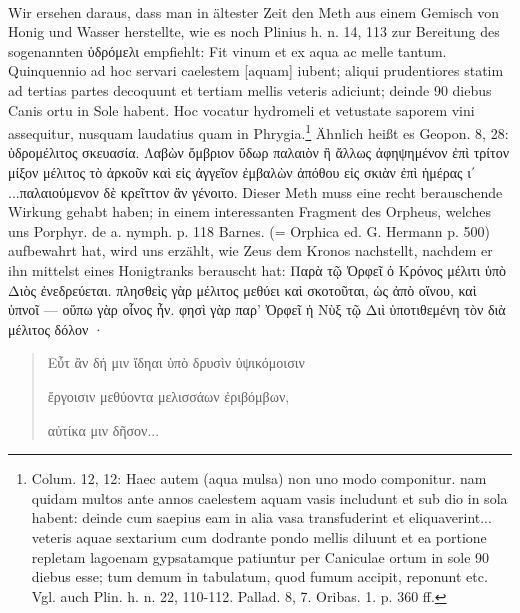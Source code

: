 \documentclass[a4paper, 11pt, oneside]{article}
\begin{document}
\paragraph{}
Wir ersehen daraus, dass man in ältester Zeit den Meth aus einem Gemisch von Honig und Wasser herstellte, wie es noch Plinius h. n. 14, 113 zur Bereitung des sogenannten ὑδρόμελι empfiehlt: Fit vinum et ex aqua ac melle tantum. Quinquennio ad hoc servari caelestem [aquam] iubent; aliqui prudentiores statim ad tertias partes decoquunt et tertiam mellis veteris adiciunt; deinde 90 diebus Canis ortu in Sole habent. Hoc vocatur hydromeli et vetustate saporem vini assequitur, nusquam laudatius quam in Phrygia.\footnote{Colum. 12, 12: Haec autem (aqua mulsa) non uno modo componitur. nam quidam multos ante annos caelestem aquam vasis includunt et sub dio in sola habent: deinde cum saepius eam in alia vasa transfuderint et eliquaverint... veteris aquae sextarium cum dodrante pondo mellis diluunt et ea portione repletam lagoenam gypsatamque patiuntur per Caniculae ortum in sole 90 diebus esse; tum demum in tabulatum, quod fumum accipit, reponunt etc. Vgl. auch Plin. h. n. 22, 110-112. Pallad. 8, 7. Oribas. 1. p. 360 ff.} Ähnlich heißt es Geopon. 8, 28: ὑδρομέλιτος σκευασία. Λαβὼν ὄμβριον ὕδωρ παλαιὸν ἢ ἄλλως ἀφηψημένον ἐπὶ τρίτον μίξον μέλιτος τὸ ἀρκοῦν καὶ εἰς ἀγγεῖον ἐμβαλὼν ἀπόθου εἰς σκιὰν ἐπὶ ἡμέρας ι΄ ...παλαιούμενον δὲ κρεῖττον ἂν γένοιτο. Dieser Meth muss eine recht berauschende Wirkung gehabt haben; in einem interessanten Fragment des Orpheus, welches uns Porphyr. de a. nymph. p. 118 Barnes. (= Orphica ed. G. Hermann p. 500) aufbewahrt hat, wird uns erzählt, wie Zeus dem Kronos nachstellt, nachdem er ihn mittelst eines Honigtranks berauscht hat: Παρὰ τῷ Ὀρφεῖ ὁ Κρόνος μέλιτι ὑπὸ Διὸς ἐνεδρεύεται. πλησθεὶς γὰρ μέλιτος μεθύει καὶ σκοτοῦται, ὡς ἀπὸ οἴνου, καὶ ὑπνοῖ --- οὕπω γὰρ οἷνος ἦν. φησὶ γὰρ παρ' Ὀρφεῖ ἡ Νὺξ τῷ Διὶ ὑποτιθεμένη τὸν διὰ μέλιτος δόλον ·
\begin{quotation}
Εὖτ ἂν δή μιν ἴδηαι ὑπὸ δρυσὶν ὑψικόμοισιν

ἔργοισιν μεθύοντα μελισσάων ἐριβόμβων,

αὐτίκα μιν δῆσον...
\end{quotation}
\end{document}
